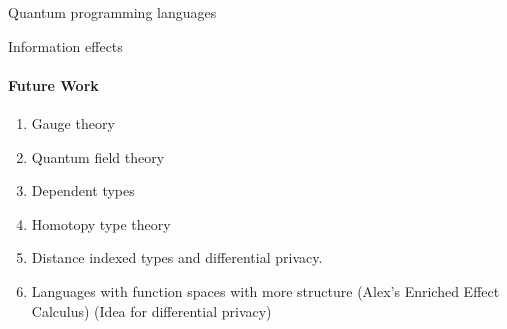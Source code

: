 \documentclass[preprint]{sigplanconf}
\theoremstyle{examplestyle}
\begin{document}
Quantum programming languages

Information effects

\paragraph{Future Work}

\begin{enumerate}
\item Gauge theory
\item Quantum field theory
\item Dependent types
\item Homotopy type theory
\item Distance indexed types and differential privacy.
\item Languages with function spaces with more structure (Alex's
  Enriched Effect Calculus) (Idea for differential privacy)
\end{enumerate}
\end{document}
